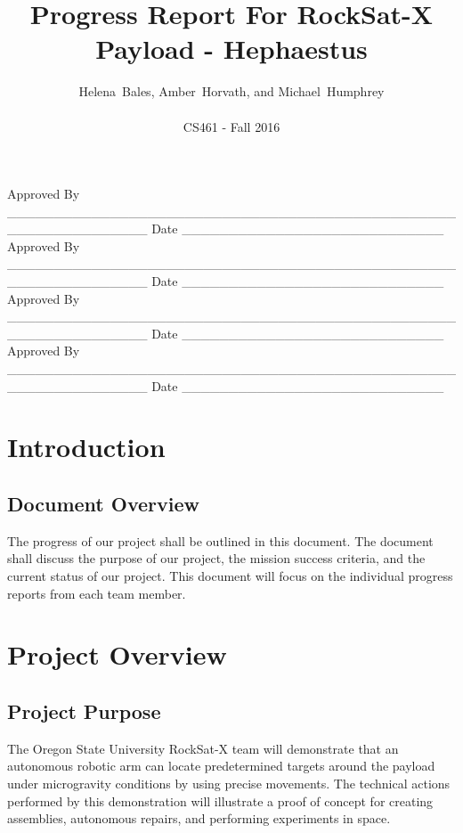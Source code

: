 \documentclass[letterpaper,10pt]{article}
\title{Progress Report For RockSat-X Payload - Hephaestus}
\author{Helena~Bales, Amber~Horvath, and Michael~Humphrey\\ \\ CS461 - Fall 2016}
\newenvironment{bottompar}{\par\vspace*{\fill}}{\clearpage}
\begin{document}
\maketitle

\begin{abstract}
\end{abstract}

\begin{bottompar}
Approved By
\_\_\_\_\_\_\_\_\_\_\_\_\_\_\_\_\_\_\_\_\_\_\_\_\_\_\_\_\_\_\_\_\_\_\_\_\_\_\_\_\_\_\_\_\_\_\_\_\_\_\_\_\_\_\_\_\_\_\_\_\_\_\_
Date \_\_\_\_\_\_\_\_\_\_\_\_\_\_\_\_\_\_\_\_\_\_\_\_\_\_\_\_ \\


Approved By
\_\_\_\_\_\_\_\_\_\_\_\_\_\_\_\_\_\_\_\_\_\_\_\_\_\_\_\_\_\_\_\_\_\_\_\_\_\_\_\_\_\_\_\_\_\_\_\_\_\_\_\_\_\_\_\_\_\_\_\_\_\_\_
Date \_\_\_\_\_\_\_\_\_\_\_\_\_\_\_\_\_\_\_\_\_\_\_\_\_\_\_\_ \\


Approved By
\_\_\_\_\_\_\_\_\_\_\_\_\_\_\_\_\_\_\_\_\_\_\_\_\_\_\_\_\_\_\_\_\_\_\_\_\_\_\_\_\_\_\_\_\_\_\_\_\_\_\_\_\_\_\_\_\_\_\_\_\_\_\_
Date \_\_\_\_\_\_\_\_\_\_\_\_\_\_\_\_\_\_\_\_\_\_\_\_\_\_\_\_ \\


Approved By
\_\_\_\_\_\_\_\_\_\_\_\_\_\_\_\_\_\_\_\_\_\_\_\_\_\_\_\_\_\_\_\_\_\_\_\_\_\_\_\_\_\_\_\_\_\_\_\_\_\_\_\_\_\_\_\_\_\_\_\_\_\_\_
Date \_\_\_\_\_\_\_\_\_\_\_\_\_\_\_\_\_\_\_\_\_\_\_\_\_\_\_\_ \\
\end{bottompar}

\clearpage
\tableofcontents
\clearpage

\section{Introduction}
\subsection{Document Overview}
The progress of our project shall be outlined in this document. The document shall discuss the purpose of our project,
the mission success criteria, and the current status of our project. This document will focus on the individual
progress reports from each team member.
\section{Project Overview}
\subsection{Project Purpose}
The Oregon State University RockSat-X team will demonstrate that an autonomous robotic arm can locate predetermined
 targets around the payload under microgravity conditions by using precise movements. 
The technical actions performed by this demonstration will illustrate a proof of concept for creating assemblies, 
autonomous repairs, and performing experiments in space. 
\end{document}
